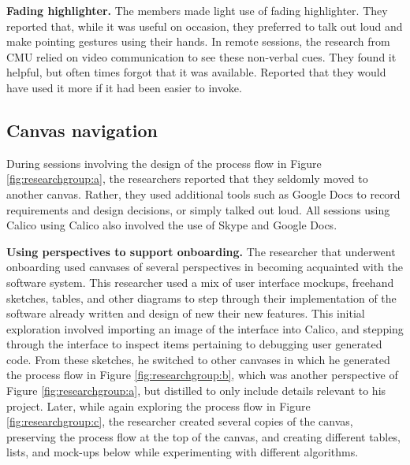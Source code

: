 
\textbf{Fading highlighter.} The members made light use of fading highlighter. They reported that, while it was useful on occasion, they preferred to talk out loud and make pointing gestures using their hands. In remote sessions, the research from CMU relied on video communication to see these non-verbal cues. They found it helpful, but often times forgot that it was available. Reported that they would have used it more if it had been easier to invoke.

\subsection{Canvas navigation}

During sessions involving the design of the process flow in Figure \ref{fig:researchgroup:a}, the researchers reported that they seldomly moved to another canvas. Rather, they used additional tools such as Google Docs to record requirements and design decisions, or simply talked out loud. All sessions using Calico using Calico also involved the use of Skype and Google Docs.

\textbf{Using perspectives to support onboarding.} The researcher that underwent onboarding used canvases of several perspectives in becoming acquainted with the software system. This researcher used a mix of user interface mockups, freehand sketches, tables, and other diagrams to step through their implementation of the software already written and design of new their new features. This initial exploration involved importing an image of the interface into Calico,  and stepping through the interface to inspect items pertaining to debugging user generated code. From these sketches, he switched to other canvases in which he generated the process flow in Figure \ref{fig:researchgroup:b}, which was another perspective of Figure \ref{fig:researchgroup:a}, but distilled to only include details relevant to his project. Later, while again exploring the process flow in Figure \ref{fig:researchgroup:c}, the researcher created several copies of the canvas, preserving the process flow at the top of the canvas, and creating different tables, lists, and mock-ups below while experimenting with different algorithms.

